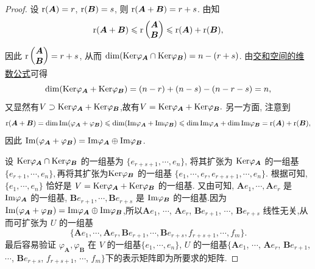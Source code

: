\documentclass[../../main.tex]{subfiles}%
\begin{document}
\begin{proof}
设 ${\rm r}(\boldsymbol{A}) = r$, ${\rm r}(\boldsymbol{B}) = s$, 则 ${\rm r}(\boldsymbol{A} + \boldsymbol{B}) = r + s$. 由知
$$
{\rm r}(\boldsymbol{A} + \boldsymbol{B}) \leqslant {\rm r}\begin{pmatrix}
\boldsymbol{A} \\
\boldsymbol{B}
\end{pmatrix} \leqslant {\rm r}(\boldsymbol{A}) + {\rm r}(\boldsymbol{B}),$$
因此 ${\rm r}\begin{pmatrix}
\boldsymbol{A} \\
\boldsymbol{B}
\end{pmatrix} = r + s$, 从而 $\dim({\rm Ker}\varphi_{\boldsymbol{A}} \cap {\rm Ker}\varphi_{\boldsymbol{B}}) = n - (r + s)$. 由\hyperref[theorem:交和空间维数公式]{交和空间的维数公式}可得 
$$\dim({\rm Ker}\varphi_{\boldsymbol{A}} + {\rm Ker}\varphi_{\boldsymbol{B}}) = (n - r) + (n - s) - (n - r - s) = n,$$
又显然有$V\supset  {\rm Ker}\varphi_{\boldsymbol{A}} + {\rm Ker}\varphi_{\boldsymbol{B}}$,故有$V = {\rm Ker}\varphi_{\boldsymbol{A}} + {\rm Ker}\varphi_{\boldsymbol{B}}.$
另一方面, 注意到 
$${\rm r}(\boldsymbol{A} + \boldsymbol{B}) = \dim{\rm Im}(\varphi_{\boldsymbol{A}} + \varphi_{\boldsymbol{B}}) \leqslant \dim({\rm Im}\varphi_{\boldsymbol{A}} + {\rm Im}\varphi_{\boldsymbol{B}}) \leqslant \dim{\rm Im}\varphi_{\boldsymbol{A}} + \dim{\rm Im}\varphi_{\boldsymbol{B}} = {\rm r}(\boldsymbol{A}) + {\rm r}(\boldsymbol{B}),$$
因此 ${\rm Im}(\varphi_{\boldsymbol{A}} + \varphi_{\boldsymbol{B}}) = {\rm Im}\varphi_{\boldsymbol{A}} \oplus {\rm Im}\varphi_{\boldsymbol{B}}$. 

设 ${\rm Ker}\varphi_{\boldsymbol{A}} \cap {\rm Ker}\varphi_{\boldsymbol{B}}$ 的一组基为 $\{e_{r + s + 1}, \cdots, e_n\}$, 将其扩张为 ${\rm Ker}\varphi_{\boldsymbol{A}}$ 的一组基 $\{e_{r + 1},\cdots, e_n\},$再将其扩张为${\rm Ker}\varphi_{\boldsymbol{B}}$ 的一组基 $\{e_1,\cdots,e_r,e_{r+s+1},\cdots, e_n\}.$
根据可知, $\{e_1, \cdots, e_n\}$ 恰好是 $V = {\rm Ker}\varphi_{\boldsymbol{A}} + {\rm Ker}\varphi_{\boldsymbol{B}}$ 的一组基. 又由可知, $\boldsymbol{A}e_1, \cdots, \boldsymbol{A}e_r$ 是 ${\rm Im}\varphi_{\boldsymbol{A}}$ 的一组基, $\boldsymbol{B}e_{r + 1}, \cdots, \boldsymbol{B}e_{r + s}$ 是 ${\rm Im}\varphi_{\boldsymbol{B}}$ 的一组基.因为${\rm Im}(\varphi_{\boldsymbol{A}} + \varphi_{\boldsymbol{B}}) = {\rm Im}\varphi_{\boldsymbol{A}} \oplus {\rm Im}\varphi_{\boldsymbol{B}}$,所以$\boldsymbol{A}e_1$, $\cdots$, $\boldsymbol{A}e_r$, $\boldsymbol{B}e_{r + 1}$, $\cdots$, $\boldsymbol{B}e_{r + s}$ 线性无关,从而可扩张为 $U$ 的一组基 $$\{\boldsymbol{A}e_1,\cdots,\boldsymbol{A}e_r,\boldsymbol{B}e_{r + 1},\cdots, \boldsymbol{B}e_{r + s}, f_{r + s + 1}, \cdots, f_m\}.$$ 最后容易验证 $\varphi_{\boldsymbol{A}}, \varphi_{\boldsymbol{B}}$ 在 $V$ 的一组基$\{e_1, \cdots, e_n\}$, $U$ 的一组基$\{\boldsymbol{A}e_1$, $\cdots$, $\boldsymbol{A}e_r$, $\boldsymbol{B}e_{r + 1}$, $\cdots$, $\boldsymbol{B}e_{r + s}$, $f_{r + s + 1}$, $\cdots$, $f_m\}$下的表示矩阵即为所要求的矩阵.
\end{proof}
\end{document}
